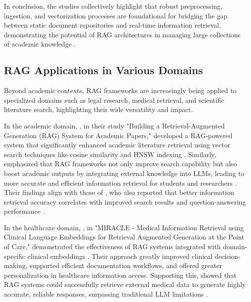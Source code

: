 \begin{refsection}
\bigbreak
In conclusion, the studies collectively highlight that robust preprocessing, ingestion, and vectorization processes are foundational for bridging the gap between static document repositories and real-time information retrieval, demonstrating the potential of RAG architectures in managing large collections of academic knowledge \cite{allu2024beyond} \cite{aquino2024extracting}.

\newpage
\clearpage
\subsection{RAG Applications in Various Domains}

Beyond academic contexts, RAG frameworks are increasingly being applied to specialized domains such as legal research, medical retrieval, and scientific literature search, highlighting their wide versatility and impact.

In the academic domain, \citeauthor{grigoryan2024building} \citeyear{grigoryan2024building}, in their study "Building a Retrieval-Augmented Generation (RAG) System for Academic Papers," developed a RAG-powered system that significantly enhanced academic literature retrieval using vector search techniques like cosine similarity and HNSW indexing \cite{grigoryan2024building}. Similarly, \citeauthor{song2024travelrag} \citeyear{song2024travelrag} emphasized that RAG frameworks not only improve search capability but also boost academic outputs by integrating external knowledge into LLMs, leading to more accurate and efficient information retrieval for students and researchers \cite{song2024travelrag}. Their findings align with those of \citeauthor{karpukhin2020dense} \citeyear{karpukhin2020dense}, who also reported that better information retrieval accuracy correlates with improved search results and question-answering performance \cite{karpukhin2020dense}.


In the healthcare domain, \citeauthor{arzideh2024miracle} \citeyear{arzideh2024miracle}, in "MIRACLE - Medical Information Retrieval using Clinical Language Embeddings for Retrieval Augmented Generation at the Point of Care," demonstrated the effectiveness of RAG systems integrated with domain-specific clinical embeddings \cite{arzideh2024miracle}. Their approach greatly improved clinical decision-making, supported efficient documentation workflows, and offered greater personalization in healthcare information access. Supporting this, \citeauthor{amugongo2024retrieval} \citeyear{amugongo2024retrieval} showed that RAG systems could successfully retrieve external medical data to generate highly accurate, reliable responses, surpassing traditional LLM limitations \cite{amugongo2024retrieval}.


\end{refsection}
